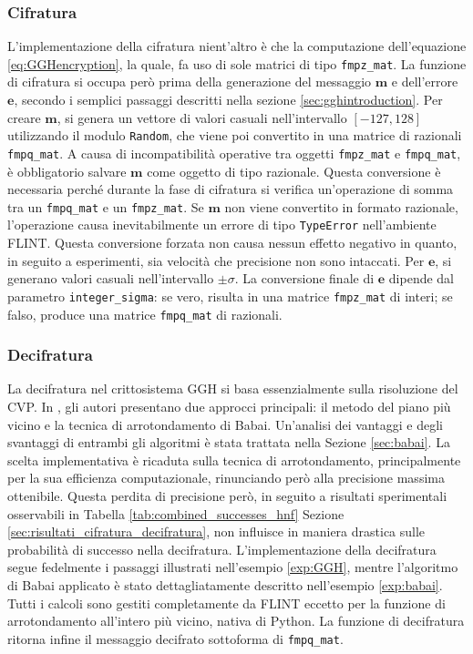 \subsubsection{Cifratura}

L'implementazione della cifratura nient'altro è che la computazione dell'equazione 
\ref{eq:GGHencryption}, la quale, fa uso di sole matrici di tipo \texttt{fmpz\_mat}.
La funzione di cifratura si occupa però prima della generazione del messaggio $\mathbf{m}$ 
e dell'errore $\mathbf{e}$, secondo i semplici passaggi descritti nella sezione 
\ref{sec:gghintroduction}. 
Per creare $\mathbf{m}$, si genera un vettore di valori casuali nell'intervallo 
$[-127, 128]$ utilizzando il modulo \texttt{Random}, che viene poi convertito in 
una matrice di razionali \texttt{fmpq\_mat}. 
A causa di incompatibilità operative tra oggetti \texttt{fmpz\_mat} e \texttt{fmpq\_mat}, è
obbligatorio salvare $\mathbf{m}$ come oggetto di tipo razionale. Questa conversione 
è necessaria perché durante la fase di cifratura si verifica un'operazione di somma 
tra un \texttt{fmpq\_mat} e un \texttt{fmpz\_mat}. Se $\mathbf{m}$ non viene convertito 
in formato razionale, l'operazione causa inevitabilmente un errore di tipo 
\texttt{TypeError} nell'ambiente FLINT. Questa conversione forzata non causa nessun effetto
negativo in quanto, in seguito a esperimenti, sia velocità che precisione non sono intaccati.  
Per $\mathbf{e}$, si generano valori 
casuali nell'intervallo $\pm \sigma$. La conversione finale di $\mathbf{e}$ dipende 
dal parametro \texttt{integer\_sigma}: se vero, risulta in una matrice \texttt{fmpz\_mat} 
di interi; se falso, produce una matrice \texttt{fmpq\_mat} di razionali. 

\subsubsection{Decifratura}

La decifratura nel crittosistema GGH si basa essenzialmente sulla risoluzione del CVP. 
In \cite{GGH97}, gli autori presentano due approcci principali: il metodo del piano più 
vicino e la tecnica di arrotondamento di Babai. Un'analisi dei vantaggi e 
degli svantaggi di entrambi gli algoritmi è stata trattata nella Sezione \ref{sec:babai}. 
La scelta implementativa è ricaduta sulla tecnica di arrotondamento, principalmente per la sua 
efficienza computazionale, rinunciando però alla precisione massima ottenibile. Questa perdita
di precisione però, in seguito a risultati sperimentali osservabili 
in Tabella \ref{tab:combined_successes_hnf} Sezione \ref{sec:risultati_cifratura_decifratura},
non influisce in maniera drastica sulle probabilità di successo nella decifratura.  
L'implementazione della decifratura segue fedelmente i passaggi illustrati nell'esempio 
\ref{exp:GGH}, mentre l'algoritmo di Babai applicato è stato dettagliatamente descritto 
nell'esempio \ref{exp:babai}. Tutti i calcoli sono gestiti completamente da FLINT eccetto
per la funzione di arrotondamento all'intero più vicino, nativa di Python. La funzione di 
decifratura ritorna infine il messaggio decifrato sottoforma di \texttt{fmpq\_mat}. 

